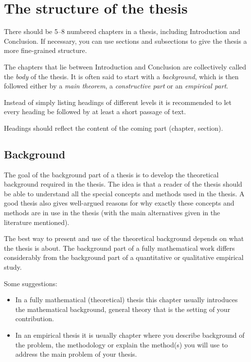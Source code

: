 \section{The structure of the thesis}

There should be 5--8 numbered chapters in a thesis, including
Introduction and Conclusion.  If necessary, you can use sections
and subsections to give the thesis a more fine-grained structure.

The chapters that lie between Introduction and Conclusion are 
collectively called the \textit{body} of the thesis.  It is
often said to start with a \textit{background}, which is then
followed either by a \textit{main theorem}, a \textit{constructive part}
or an \textit{empirical part}.

Instead of simply listing headings of different levels it is recommended to let every
heading be followed by at least a short passage of text.

Headings should reflect the content of the coming part (chapter, section).

\subsection{Background}
\label{background}

The goal of the background part of a thesis is to develop the
theoretical background required in the thesis.  The idea is that a
reader of the thesis should be able to understand all the special 
concepts and methods used in the thesis.
A good thesis also gives well-argued reasons for why exactly these
concepts and methods are in use in the thesis (with the main
alternatives given in the literature mentioned).

The best way to present and use of the theoretical background depends on
what the thesis is about. The background part of a
fully mathematical work differs considerably from the background part of a quantitative or qualitative
empirical study. 

Some suggestions:
\begin{itemize}
\item In a fully mathematical (theoretical) thesis this chapter usually introduces the 
mathematical background, general theory that is the setting of your contribution.
\item In an empirical thesis it is usually chapter where you describe background of the problem, the 
methodology or explain the method(s) you will use to address the main problem 
of your thesis.
\end{itemize}

